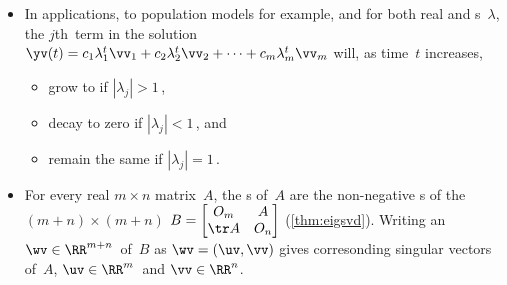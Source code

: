 \begin{itemize}
\itemme Suppose the \(n\times n\) ~\(A\) governs the dynamics of \(\yv(t)\in\RR^n\) according to \(\yv(t+1)=A\yv(t)\) (\autoref{thm:dynsol}).
\begin{itemize}
\item Let \hlist\lambda m\ be s of~\(A\) and \hlist\vv m\ be corresponding s, then a solution of \(\yv(t+1)=A\yv(t)\) is the 
\begin{equation*}
\yv(t)=c_1\lambda_1^t\vv_1+c_2\lambda_2^t\vv_2+\cdots+c_m\lambda_m^t\vv_m
\end{equation*}
for all constants \hlist cm.

\sloppy
\item Further, if the number of eigenvectors \(m=n\) (the size of~\(A\)), and the matrix of eigenvectors \(P=\begin{bmatrix} \vv_1&\vv_2&\cdots&\vv_n \end{bmatrix}\) is , then the general  is a  in that unique constants \hlist cn\ may be found for every given ~\(\yv(0)\).
\end{itemize}

\item In applications, to population models for example, and for both real and s~\(\lambda\), the \(j\)th~term in the solution \(\yv(t)=c_1\lambda_1^t\vv_1+c_2\lambda_2^t\vv_2+\cdots+c_m\lambda_m^t\vv_m\) will, as time~\(t\) increases,
\begin{itemize}
\item grow to  if \(|\lambda_j|>1\)\,,
\item decay to zero if \(|\lambda_j|<1\)\,, and
\item remain the same  if \(|\lambda_j|=1\)\,.
\end{itemize}


\item For every real \(m\times n\) matrix~\(A\), the s of~\(A\) are the non-negative s of the \((m+n)\times(m+n)\)  \(B=\begin{bmatrix} O_m&A\\\tr A&O_n \end{bmatrix}\) (\autoref{thm:eigsvd}). 
Writing an ~\(\wv\in\RR^{m+n}\)\ of~\(B\) as \(\wv=(\uv,\vv)\) gives corresonding singular vectors of~\(A\), \(\uv\in\RR^m\)\ and \(\vv\in\RR^n\).



\end{itemize}
